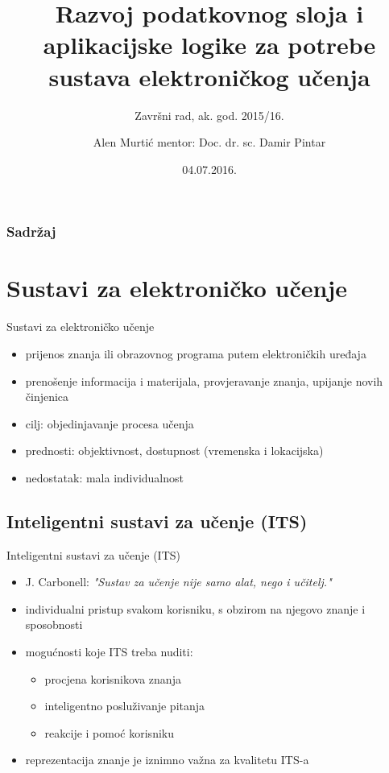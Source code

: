 \documentclass[times, utf8, numeric]{beamer}
\title{Razvoj podatkovnog sloja i aplikacijske logike za potrebe sustava elektroničkog učenja}
\subtitle{Završni rad, ak. god. 2015/16.}
\author{Alen Murtić
	\newline mentor: Doc. dr. sc. Damir Pintar}
\institute{Faklutet elektrotehnike i računarstva, Sveučilište u Zagrebu}
\date{04.07.2016.}
\begin{document}
\begin{frame}
	\titlepage
\end{frame}

\begin{frame}
	\frametitle{Sadržaj}
	\tableofcontents
\end{frame}

\section{Sustavi za elektroničko učenje}

\begin{frame}{Sustavi za elektroničko učenje}
	\begin{itemize}
		\item prijenos znanja ili obrazovnog programa putem elektroničkih uređaja
		\item prenošenje informacija i materijala, provjeravanje znanja, upijanje novih činjenica
		\item cilj: objedinjavanje procesa učenja
		\item prednosti: objektivnost, dostupnost (vremenska i lokacijska)
		\item nedostatak: mala individualnost
	\end{itemize}
\end{frame}

\subsection{Inteligentni sustavi za učenje (ITS)}
\begin{frame}{Inteligentni sustavi za učenje (ITS)}
\begin{itemize}
	\item J. Carbonell: \textit{"Sustav za učenje nije samo alat, nego i učitelj."}
	\item individualni pristup svakom korisniku, s obzirom na njegovo znanje i sposobnosti
	\item mogućnosti koje ITS treba nuditi:
	\begin{itemize}
		\item procjena korisnikova znanja
		\item inteligentno posluživanje pitanja
		\item reakcije i pomoć korisniku
	\end{itemize}
	\item reprezentacija znanje je iznimno važna za kvalitetu ITS-a
\end{itemize}
\end{frame}
\end{document}
